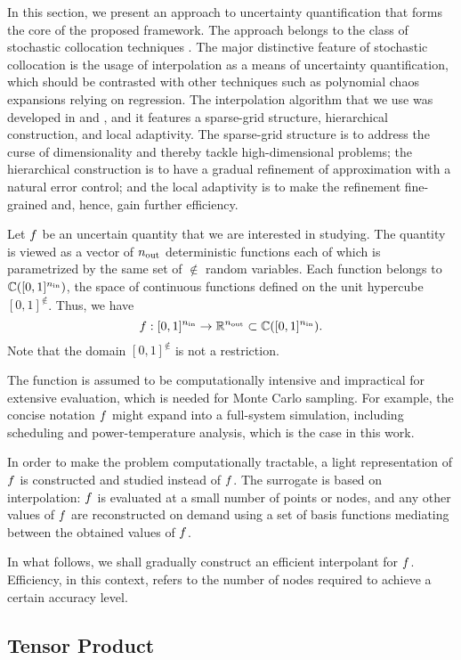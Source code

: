 In this section, we present an approach to uncertainty quantification that forms
the core of the proposed framework. The approach belongs to the class of
stochastic collocation techniques \cite{xiu2010}. The major distinctive feature
of stochastic collocation is the usage of interpolation as a means of
uncertainty quantification, which should be contrasted with other techniques
such as polynomial chaos expansions relying on regression. The interpolation
algorithm that we use was developed in \cite{klimke2006} and \cite{ma2009}, and
it features a sparse-grid structure, hierarchical construction, and local
adaptivity. The sparse-grid structure is to address the curse of dimensionality
and thereby tackle high-dimensional problems; the hierarchical construction is
to have a gradual refinement of approximation with a natural error control; and
the local adaptivity is to make the refinement fine-grained and, hence, gain
further efficiency.

Let $f$ be an uncertain quantity that we are interested in studying. The
quantity is viewed as a vector of ${n_\text{out}}$ deterministic functions each of which
is parametrized by the same set of $\nin$ random variables. Each function
belongs to $\mathbb{C}([0, 1]^{n_\text{in}})$, the space of continuous functions defined
on the unit hypercube $[0, 1]^\nin$. Thus, we have
\[
  f: [0, 1]^{n_\text{in}} \to \mathbb{R}^{n_\text{out}} \subset \mathbb{C}([0, 1]^{n_\text{in}}).
\]
Note that the domain $[0, 1]^\nin$ is not a restriction.

The function is assumed to be computationally intensive and impractical for
extensive evaluation, which is needed for Monte Carlo sampling. For example, the
concise notation $f$ might expand into a full-system simulation, including
scheduling and power-temperature analysis, which is the case in this work.

In order to make the problem computationally tractable, a light representation
of $f$ is constructed and studied instead of $f$. The surrogate is based on
interpolation: $f$ is evaluated at a small number of points or nodes, and any
other values of $f$ are reconstructed on demand using a set of basis functions
mediating between the obtained values of $f$.

In what follows, we shall gradually construct an efficient interpolant for $f$.
Efficiency, in this context, refers to the number of nodes required to achieve a
certain accuracy level.

\subsection{Tensor Product} 


